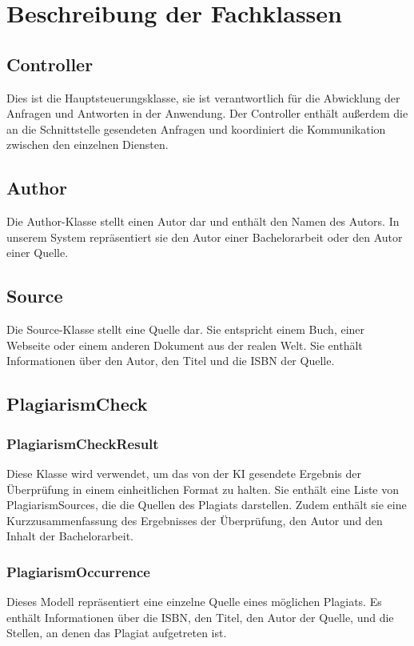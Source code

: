 \section{Beschreibung der Fachklassen}\label{sec:beschreibung_der_fachklassen}

\subsection{Controller}\label{subsec:controller}
Dies ist die Hauptsteuerungsklasse,
sie ist verantwortlich für die Abwicklung der Anfragen und Antworten in der Anwendung.
Der Controller enthält außerdem die an die Schnittstelle gesendeten Anfragen und koordiniert die Kommunikation zwischen den einzelnen Diensten.

\subsection{Author}\label{subsec:author}
Die Author-Klasse stellt einen Autor dar und enthält den Namen des Autors.
In unserem System repräsentiert sie den Autor einer Bachelorarbeit oder den Autor einer Quelle.

\subsection{Source}\label{subsec:source}
Die Source-Klasse stellt eine Quelle dar.
Sie entspricht einem Buch, einer Webseite oder einem anderen Dokument aus der realen Welt.
Sie enthält Informationen über den Autor, den Titel und die ISBN der Quelle.

\subsection{PlagiarismCheck}\label{subsec:plagiarism_check}

\subsubsection{PlagiarismCheckResult}\label{subsubsec:plagiarism_check_result}
Diese Klasse wird verwendet, um das von der KI gesendete Ergebnis der Überprüfung in einem einheitlichen Format zu halten.
Sie enthält eine Liste von PlagiarismSources, die die Quellen des Plagiats darstellen.
Zudem enthält sie eine Kurzzusammenfassung des Ergebnisses der Überprüfung,
den Autor und den Inhalt der Bachelorarbeit.

\subsubsection{PlagiarismOccurrence}\label{subsubsec:plagiarism_occurrence}
Dieses Modell repräsentiert eine einzelne Quelle eines möglichen Plagiats.
Es enthält Informationen über die ISBN, den Titel,
den Autor der Quelle, und die Stellen, an denen das Plagiat aufgetreten ist.

